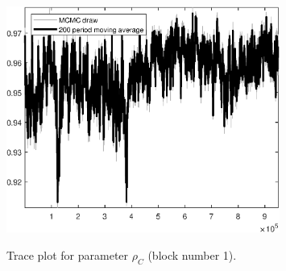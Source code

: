 \begin{figure}[H]
\centering
  \includegraphics[width=0.8\textwidth]{BRS_growth_util_sectoral/graphs/TracePlot_rho_C_blck_1}\\
    \caption{Trace plot for parameter ${\rho_C}$ (block number 1).}
\end{figure}
